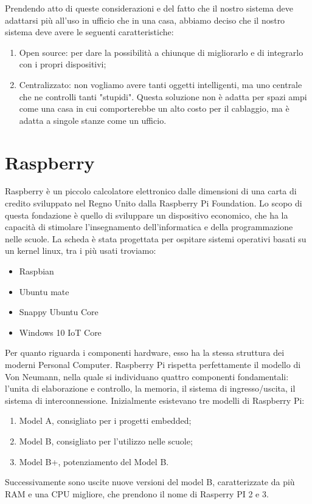 Prendendo atto di queste considerazioni e del fatto che il nostro sistema deve adattarsi più all'uso in ufficio che in una casa, abbiamo deciso che il nostro sistema deve avere le seguenti caratteristiche:
\begin{enumerate}
\item Open source: per dare la possibilità a chiunque di migliorarlo e di integrarlo con i propri dispositivi;
\item Centralizzato: non vogliamo avere tanti oggetti intelligenti,
ma uno centrale che ne controlli tanti "stupidi". Questa soluzione non è adatta per spazi ampi come una casa in cui comporterebbe un alto costo per il cablaggio, ma è adatta a singole stanze come un ufficio. 
\end{enumerate} 

\section{Raspberry}
Raspberry è un piccolo calcolatore elettronico dalle dimensioni di una
carta di credito sviluppato nel Regno Unito dalla Raspberry Pi
Foundation. Lo scopo di questa fondazione è quello di sviluppare un
dispositivo economico, che ha la capacità di stimolare l'insegnamento
dell'informatica e della programmazione nelle scuole. La scheda è stata
progettata per ospitare sistemi operativi basati su un kernel linux, tra i
più usati troviamo:
\begin{itemize}
\item Raspbian
\item Ubuntu mate
\item Snappy Ubuntu Core
\item Windows 10 IoT Core
\end{itemize}
Per quanto riguarda i componenti hardware, esso ha la stessa struttura
dei moderni Personal Computer. Raspberry Pi rispetta perfettamente il
modello di Von Neumann, nella quale si individuano quattro componenti
fondamentali: l'unita di elaborazione e controllo, la memoria, il sistema
di ingresso/uscita, il sistema di interconnessione. Inizialmente esistevano tre modelli di Raspberry Pi:
\begin{enumerate}
\item Model A, consigliato per i progetti embedded;
\item Model B, consigliato per l'utilizzo nelle scuole;
\item Model B+, potenziamento del Model B.
\end{enumerate}
Successivamente sono uscite nuove versioni del model B, caratterizzate da più RAM e una CPU migliore, che prendono il nome di Rasperry PI 2 e 3.
